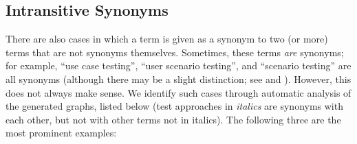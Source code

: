 \subsection{Intransitive Synonyms}\label{multiSyns}
There are also cases in which a term is given as a synonym to two (or more)
terms that are not synonyms themselves. Sometimes, these terms
\emph{are} synonyms; for example, \citetISTQB{} 
``use case testing'', ``user scenario testing'', and ``scenario testing'' are
all synonyms (although there may be a slight distinction; see
 and ).
%
%
%
%
However, this does not always make sense. We identify \multiSynCount{}
such cases through automatic analysis of the generated graphs\ifnotpaper,
listed below (test approaches in \emph{italics} are synonyms with each other,
but not with other terms not in italics)\else. The following three are the most prominent examples\fi:

\begin{enumerate}
    
\end{enumerate}

